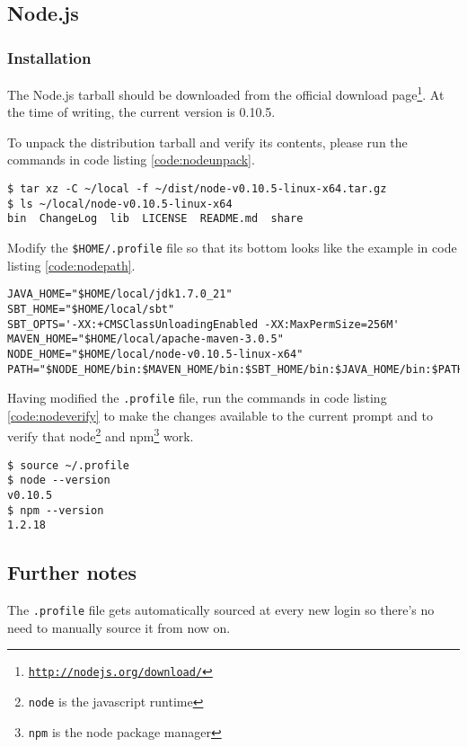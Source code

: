 \subsection{Node.js}
\subsubsection{Installation}

The Node.js tarball should be downloaded from the official download
page\footnote{\href{http://nodejs.org/download/}{\texttt{http://nodejs.org/download/}}}.
At the time of writing, the current version is 0.10.5.

To unpack the distribution tarball and verify its contents, please run
the commands in code listing \ref{code:nodeunpack}.

\begin{lstlisting}[label=code:nodeunpack,caption=Unpacking the tarball to the \texttt{local} directory and checking its contents]
$ tar xz -C ~/local -f ~/dist/node-v0.10.5-linux-x64.tar.gz 
$ ls ~/local/node-v0.10.5-linux-x64
bin  ChangeLog  lib  LICENSE  README.md  share
\end{lstlisting}

Modify the \texttt{\$HOME/.profile} file so that its bottom looks like
the example in code listing \ref{code:nodepath}.

\begin{lstlisting}[label=code:nodepath,caption=Code to add to the bottom of the \texttt{.profile} file]
JAVA_HOME="$HOME/local/jdk1.7.0_21"
SBT_HOME="$HOME/local/sbt"
SBT_OPTS='-XX:+CMSClassUnloadingEnabled -XX:MaxPermSize=256M'
MAVEN_HOME="$HOME/local/apache-maven-3.0.5"
NODE_HOME="$HOME/local/node-v0.10.5-linux-x64"
PATH="$NODE_HOME/bin:$MAVEN_HOME/bin:$SBT_HOME/bin:$JAVA_HOME/bin:$PATH"
\end{lstlisting}

Having modified the \texttt{.profile} file, run the commands in code
listing \ref{code:nodeverify} to make the changes available to the
current prompt and to verify that node\footnote{\texttt{node} is the
javascript runtime} and npm\footnote{\texttt{npm} is the node package
manager} work.

\begin{lstlisting}[label=code:nodeverify,caption=Sourcing the \texttt{.profile} file and verifying that node and npm work]
$ source ~/.profile
$ node --version
v0.10.5
$ npm --version
1.2.18
\end{lstlisting}

\subsection{Further notes}

The \texttt{.profile} file gets automatically sourced at every new login so there's no need to manually source it from now on.
